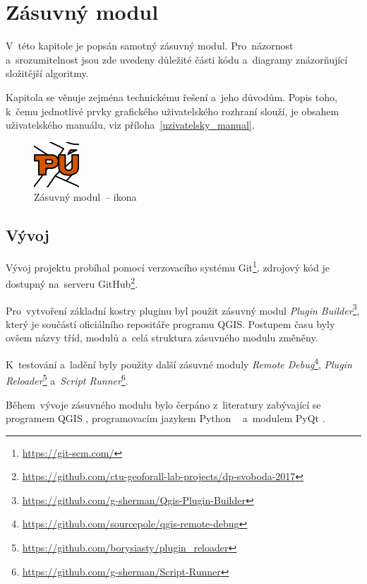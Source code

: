 \chapter{Zásuvný modul}
\label{plugin}

V~této kapitole je popsán samotný zásuvný modul. Pro~názornost a~srozumitelnost jsou zde uvedeny důležité části kódu a~diagramy znázorňující složitější algoritmy.

Kapitola se věnuje zejména technickému řešení a~jeho důvodům. Popis toho, k~čemu jednotlivé prvky grafického uživatelského rozhraní slouží, je obsahem uživatelského manuálu, viz příloha~\ref{uzivatelsky_manual}.

	\begin{figure}[H]
		\centering
		\includegraphics[width=.1\textwidth]{./pictures/puplugin.png}
		\caption[Zásuvný modul~– ikona]{Zásuvný modul~– ikona}
		\label{fig:ikona_pluginu}
 	\end{figure}

\section{Vývoj}
\label{vyvoj}

Vývoj projektu probíhal pomocí verzovacího systému Git\footnote{\url{https://git-scm.com/}}, zdrojový kód je dostupný na~serveru GitHub\footnote{\url{https://github.com/ctu-geoforall-lab-projects/dp-svoboda-2017}}.

Pro~vytvoření základní kostry pluginu byl použit zásuvný modul \textit{Plugin Builder}\footnote{\url{https://github.com/g-sherman/Qgis-Plugin-Builder}}, který je součástí oficiálního repositáře programu QGIS. Postupem času byly ovšem názvy tříd, modulů a~celá struktura zásuvného modulu změněny.

K~testování a~ladění byly použity další zásuvné moduly \textit{Remote Debug}\footnote{\url{https://github.com/sourcepole/qgis-remote-debug}}, \textit{Plugin Reloader}\footnote{\url{https://github.com/borysiasty/plugin_reloader}} a~\textit{Script Runner}\footnote{\url{https://github.com/g-sherman/Script-Runner}}.

Během~vývoje zásuvného modulu bylo čerpáno z~literatury zabývající se programem QGIS \citep{pyqgis_book}, programovacím jazykem Python \citep{python3_oop_book}~\citep{dive_into_python} a~modulem PyQt \citep{pyqt_book}.

